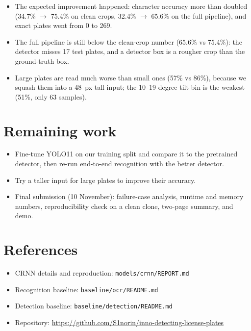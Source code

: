 \documentclass[11pt]{article}
\begin{document}
\begin{itemize}
\item The expected improvement happened: character accuracy more than
  doubled (34.7\% $\rightarrow$ 75.4\% on clean crops, 32.4\%
  $\rightarrow$ 65.6\% on the full pipeline), and exact plates went from 0
  to 269.
\item The full pipeline is still below the clean-crop number (65.6\% vs
  75.4\%): the detector misses 17 test plates, and a detector box is a
  rougher crop than the ground-truth box.
\item Large plates are read much worse than small ones (57\% vs 86\%),
  because we squash them into a 48~px tall input; the 10--19 degree tilt bin
  is the weakest (51\%, only 63 samples).
\end{itemize}

\section*{Remaining work}

\begin{itemize}
\item Fine-tune YOLO11 on our training split and compare it to the
  pretrained detector, then re-run end-to-end recognition with the better
  detector.
\item Try a taller input for large plates to improve their accuracy.
\item Final submission (10 November): failure-case analysis, runtime and
  memory numbers, reproducibility check on a clean clone, two-page summary,
  and demo.
\end{itemize}

\section*{References}

\begin{itemize}
\item CRNN details and reproduction: \texttt{models/crnn/REPORT.md}
\item Recognition baseline: \texttt{baseline/ocr/README.md}
\item Detection baseline: \texttt{baseline/detection/README.md}
\item Repository: \url{https://github.com/S1norin/inno-detecting-license-plates}
\end{itemize}
\end{document}
